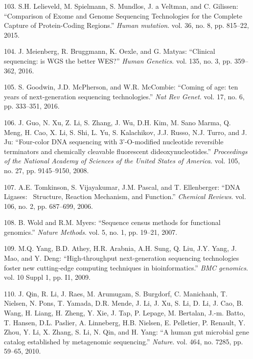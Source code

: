 \documentclass[12pt,twoside]{ugathesis}
\theoremstyle{definition}
\theoremstyle{definition}
\theoremstyle{remark}
\begin{document}
\hypertarget{ref-Lelieveld2015}{}
103. S.H. Lelieveld, M. Spielmann, S. Mundlos, J. a Veltman, and C.
Gilissen: ``Comparison of Exome and Genome Sequencing Technologies for
the Complete Capture of Protein-Coding Regions.'' \emph{Human mutation}.
vol. 36, no. 8, pp. 815--22, 2015.

\hypertarget{ref-Meienberg2016}{}
104. J. Meienberg, R. Bruggmann, K. Oexle, and G. Matyas: ``Clinical
sequencing: is WGS the better WES?'' \emph{Human Genetics}. vol. 135,
no. 3, pp. 359--362, 2016.

\hypertarget{ref-Goodwin2016}{}
105. S. Goodwin, J.D. McPherson, and W.R. McCombie: ``Coming of age: ten
years of next-generation sequencing technologies.'' \emph{Nat Rev
Genet}. vol. 17, no. 6, pp. 333--351, 2016.

\hypertarget{ref-Guo2008}{}
106. J. Guo, N. Xu, Z. Li, S. Zhang, J. Wu, D.H. Kim, M. Sano Marma, Q.
Meng, H. Cao, X. Li, S. Shi, L. Yu, S. Kalachikov, J.J. Russo, N.J.
Turro, and J. Ju: ``Four-color DNA sequencing with 3'-O-modified
nucleotide reversible terminators and chemically cleavable fluorescent
dideoxynucleotides.'' \emph{Proceedings of the National Academy of
Sciences of the United States of America}. vol. 105, no. 27, pp.
9145--9150, 2008.

\hypertarget{ref-Tomkinson2006}{}
107. A.E. Tomkinson, S. Vijayakumar, J.M. Pascal, and T. Ellenberger:
``DNA Ligases:~ Structure, Reaction Mechanism, and Function.''
\emph{Chemical Reviews}. vol. 106, no. 2, pp. 687--699, 2006.

\hypertarget{ref-Wold2007}{}
108. B. Wold and R.M. Myers: ``Sequence census methods for functional
genomics.'' \emph{Nature Methods}. vol. 5, no. 1, pp. 19--21, 2007.

\hypertarget{ref-Yang2009}{}
109. M.Q. Yang, B.D. Athey, H.R. Arabnia, A.H. Sung, Q. Liu, J.Y. Yang,
J. Mao, and Y. Deng: ``High-throughput next-generation sequencing
technologies foster new cutting-edge computing techniques in
bioinformatics.'' \emph{BMC genomics}. vol. 10 Suppl 1, pp. I1, 2009.

\hypertarget{ref-Qin2010}{}
110. J. Qin, R. Li, J. Raes, M. Arumugam, S. Burgdorf, C. Manichanh, T.
Nielsen, N. Pons, T. Yamada, D.R. Mende, J. Li, J. Xu, S. Li, D. Li, J.
Cao, B. Wang, H. Liang, H. Zheng, Y. Xie, J. Tap, P. Lepage, M.
Bertalan, J.-m. Batto, T. Hansen, D.L. Paslier, A. Linneberg, H.B.
Nielsen, E. Pelletier, P. Renault, Y. Zhou, Y. Li, X. Zhang, S. Li, N.
Qin, and H. Yang: ``A human gut microbial gene catalog established by
metagenomic sequencing.'' \emph{Nature}. vol. 464, no. 7285, pp. 59--65,
2010.
\end{document}
